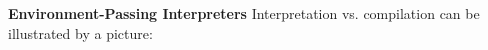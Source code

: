 \begin{minipage}[t]{\sw}
\slidenumber
\LARGE
{\bf Environment-Passing Interpreters}\exx
Interpretation vs. compilation can be illustrated by a picture:\exx
{}
\end{minipage}

